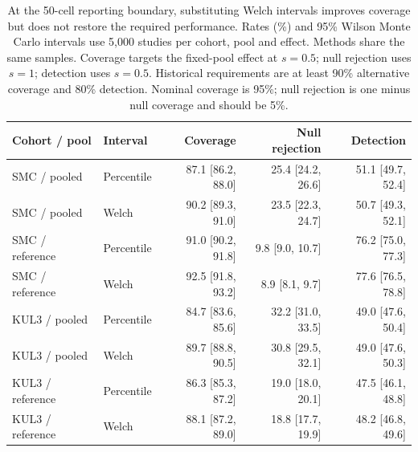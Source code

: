 \begin{table}[htbp]
\centering\small
\caption{At the 50-cell reporting boundary, substituting Welch intervals improves coverage
but does not restore the required performance. Rates (\%) and 95\% Wilson
Monte Carlo intervals use 5{,}000 studies per cohort, pool and effect. Methods
share the same samples. Coverage targets the fixed-pool effect at $s=0.5$;
null rejection uses $s=1$; detection uses $s=0.5$. Historical requirements are at least 90\%
alternative coverage and 80\% detection. Nominal coverage is 95\%; null
rejection is one minus null coverage and should be 5\%.}
\label{tab:precision}
\begin{tabular}{@{}llrrr@{}}
\toprule
Cohort / pool & Interval & Coverage & Null rejection & Detection \\
\midrule
SMC / pooled & Percentile & 87.1 [86.2, 88.0] & 25.4 [24.2, 26.6] & 51.1 [49.7, 52.4] \\
SMC / pooled & Welch & 90.2 [89.3, 91.0] & 23.5 [22.3, 24.7] & 50.7 [49.3, 52.1] \\
SMC / reference & Percentile & 91.0 [90.2, 91.8] & 9.8 [9.0, 10.7] & 76.2 [75.0, 77.3] \\
SMC / reference & Welch & 92.5 [91.8, 93.2] & 8.9 [8.1, 9.7] & 77.6 [76.5, 78.8] \\
KUL3 / pooled & Percentile & 84.7 [83.6, 85.6] & 32.2 [31.0, 33.5] & 49.0 [47.6, 50.4] \\
KUL3 / pooled & Welch & 89.7 [88.8, 90.5] & 30.8 [29.5, 32.1] & 49.0 [47.6, 50.3] \\
KUL3 / reference & Percentile & 86.3 [85.3, 87.2] & 19.0 [18.0, 20.1] & 47.5 [46.1, 48.8] \\
KUL3 / reference & Welch & 88.1 [87.2, 89.0] & 18.8 [17.7, 19.9] & 48.2 [46.8, 49.6] \\
\bottomrule
\end{tabular}
\end{table}
